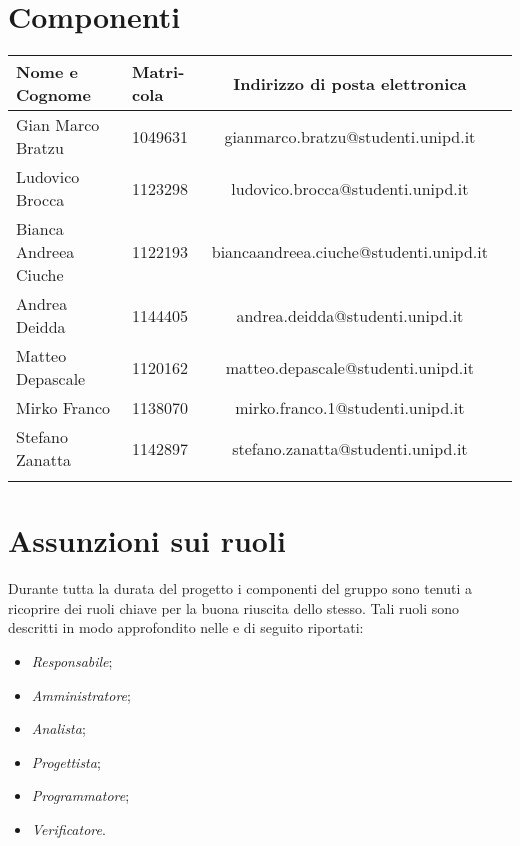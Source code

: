 \section{Componenti}
\label{componenti}
		\begin{tabularx}{\textwidth}{|X|X|c|X|}
			\hline
			\textbf{Nome e Cognome} &\textbf{Matri-}\newline \textbf{cola} & \textbf{Indirizzo di posta elettronica} \\
			\hline 
			Gian Marco Bratzu & 1049631 &gianmarco.bratzu@studenti.unipd.it \\
			\hline
			Ludovico Brocca & 1123298 & ludovico.brocca@studenti.unipd.it \\
			\hline
			Bianca Andreea Ciuche & 1122193 & biancaandreea.ciuche@studenti.unipd.it \\
			\hline
			Andrea Deidda & 1144405 & andrea.deidda@studenti.unipd.it \\
			\hline
			Matteo Depascale & 1120162 & matteo.depascale@studenti.unipd.it \\
			\hline
			Mirko Franco & 1138070 &  mirko.franco.1@studenti.unipd.it \\
			\hline
			Stefano Zanatta & 1142897 & stefano.zanatta@studenti.unipd.it \\
			\hline
			\caption{Componenti}
		\end{tabularx}
\section{Assunzioni sui ruoli}
	Durante tutta la durata del progetto i componenti del gruppo sono tenuti a ricoprire dei ruoli chiave per la buona riuscita dello stesso.
	Tali ruoli sono descritti in modo approfondito nelle \normediprogetto e di seguito riportati:
	\begin{itemize}
		\item \textit{Responsabile};
		\item \textit{Amministratore};
		\item \textit{Analista};
		\item \textit{Progettista};
		\item \textit{Programmatore};
		\item \textit{Verificatore}.
	\end{itemize}
	\begin{comment}
		
	Ciascun ruolo ha un diverso costo. Di seguito verrà riportato, per ogni ruolo, il suo costo orario:

		\begin{tabularx}{\textwidth}{|c|c|}
			\hline
			\textbf{Ruolo} & \textbf{Costo} \\
			\hline
			Responsabile & 30 \euro \\
			Amministratore & 20 \euro \\
			Analista & 25 \euro \\
			Progettista & 22 \euro \\
			Programmatore & 15 \euro \\
			Verificatore & 15 \euro \\
			\hline
			\caption{Costi per ruolo}
		\end{tabularx}

	\end{comment}